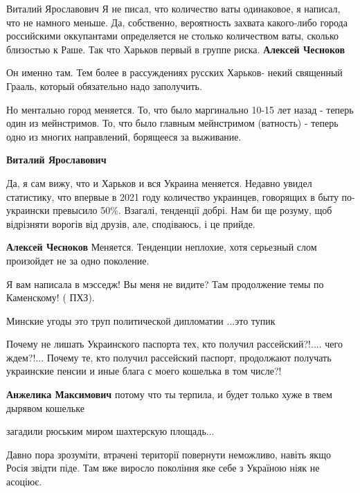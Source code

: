 \begin{itemize}
\begin{itemize}
Виталий Ярославович Я не писал, что количество ваты одинаковое, я написал, что не намного меньше. Да, собственно, вероятность захвата какого-либо города российскими оккупантами определяется не столько количеством ваты, сколько близостью к Раше. Так что Харьков первый в группе риска.
\textbf{Алексей Чесноков} 

Он именно там. Тем более в рассуждениях русских Харьков- некий священный
Грааль, который обязательно надо заполучить.

Но ментально город меняется. То, что было маргинально 10-15 лет назад - теперь
один из мейнстримов. То, что было главным мейнстримом (ватность) - теперь одно
из многих направлений, борящееся за выживание.


\textbf{Виталий Ярославович} 

Да, я сам вижу, что и Харьков и вся Украина меняется. Недавно увидел
статистику, что впервые в 2021 году количество украинцев, говорящих в быту
по-украински превысило 50\%. Взагалі, тенденції добрі. Нам би ще розуму, щоб
відрізняти ворогів від друзів, але, сподіваюсь, і це прийде.


\textbf{Алексей Чесноков} Меняется. Тенденции неплохие, хотя серьезный слом произойдет не за одно поколение.
\end{itemize} %

Я вам написала в мэсседж! Вы меня не видите? Там продолжение темы по Каменскому! ( ПХЗ).

Минские угоды это труп политической дипломатии ...это тупик


Почему не лишать Украинского паспорта тех, кто получил рассейский?!.... чего
ждем?!... Почему те, кто получил рассейский паспорт, продолжают получать
украинские пенсии и иные блага с моего кошелька в том числе?!

\begin{itemize} %
\textbf{Анжелика Максимович} потому что ты терпила, и будет только хуже в твем дырявом кошельке
\end{itemize} %

загадили рюським миром шахтерскую площадь...


Давно пора зрозуміти, втрачені території повернути неможливо, навіть якщо Росія
звідти піде. Там вже виросло покоління яке себе з Україною ніяк не асоціює.


\end{itemize}
